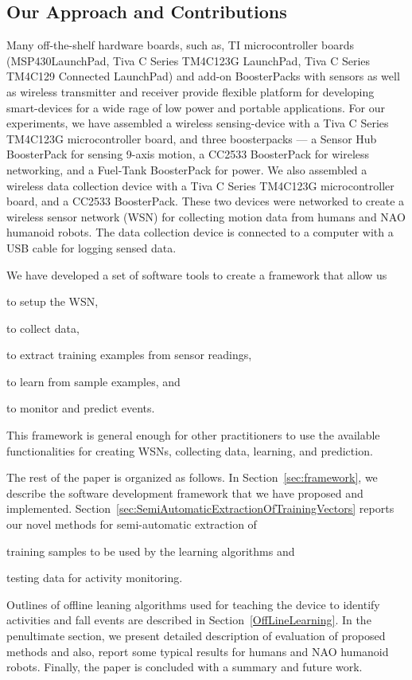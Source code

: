 \documentclass{IEEEtran}
\begin{document}
\subsection{Our Approach and Contributions}

Many off-the-shelf hardware boards, such as, TI microcontroller boards (MSP430{\texttrademark}LaunchPad, Tiva{\texttrademark} C Series 
TM4C123G LaunchPad, Tiva C Series TM4C129 Connected LaunchPad) and add-on  BoosterPacks   with sensors as well as  wireless transmitter and receiver  provide flexible platform for 
developing smart-devices for a wide rage of low power and portable applications. For our experiments, 
we have assembled a wireless sensing-device with a Tiva C Series TM4C123G microcontroller board, and three 
boosterpacks --- a
Sensor Hub BoosterPack  for sensing 9-axis motion,  a CC2533  BoosterPack for wireless 
networking, and a Fuel-Tank BoosterPack for power. We also assembled a wireless data collection device with a Tiva C Series TM4C123G microcontroller board, and a  CC2533  BoosterPack. These two devices were networked to create a wireless sensor network (WSN) for 
collecting motion data from  humans and NAO humanoid robots. The data collection device is connected to a computer with a USB cable for logging sensed data.   

We have developed a set of software tools to create a framework that allow us
\begin{inparaenum}[($i$)] \item  to setup the WSN, \item to collect data, \item to extract training examples from sensor readings, \item to learn from sample examples, and \item 
to monitor and predict events. \end{inparaenum} This framework is general enough for other practitioners to use the
available functionalities for creating WSNs, collecting data, learning, and prediction.

The rest of the paper is organized as follows. In Section~\ref{sec:framework}, we describe the software development 
framework that we have proposed and implemented.
Section~\ref{sec:SemiAutomaticExtractionOfTrainingVectors} reports our novel methods for  semi-automatic extraction  of \begin{inparaenum} [($i$)] \item training samples to be used by the learning algorithms  and \item testing data for activity monitoring. \end{inparaenum} Outlines of offline leaning algorithms used for teaching the device to identify activities and fall events are described in Section~\ref{OffLineLearning}. 
 In the penultimate section, we present detailed description of evaluation of proposed methods and also, report some typical results for humans and NAO humanoid 
robots. 
Finally, the paper is concluded with a summary and future work.  
\end{document}
